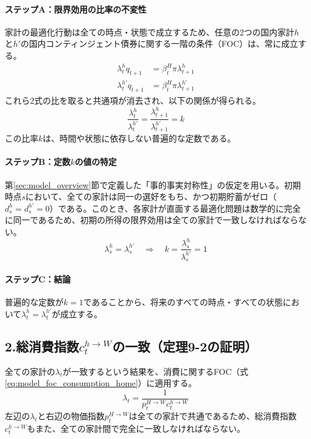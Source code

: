 \paragraph{ステップA：限界効用の比率の不変性}
\label{sec:appendix_risk_sharing_sub1_step_a}
家計の最適化行動は全ての時点・状態で成立するため、任意の2つの国内家計\(h\)と\(h'\)の国内コンティンジェント債券に関する一階の条件（FOC）は、常に成立する。
\begin{align}
\lambda_t^hq_{t+1}&=\beta_t^H\pi\lambda_{t+1}^h \label{eq:appendix_risk_sharing_sub1_foc_h} \\
\lambda_t^{h'}q_{t+1}&=\beta_t^H\pi\lambda_{t+1}^{h'} \label{eq:appendix_risk_sharing_sub1_foc_h_prime}
\end{align}
これら2式の比を取ると共通項が消去され、以下の関係が得られる。
\begin{equation}
\frac{\lambda_t^h}{\lambda_t^{h'}}=\frac{\lambda_{t+1}^h}{\lambda_{t+1}^{h'}}=k
    \label{eq:appendix_risk_sharing_sub1_constant_ratio}
\end{equation}
この比率\(k\)は、時間や状態に依存しない普遍的な定数である。

\paragraph{ステップB：定数\(k\)の値の特定}
\label{sec:appendix_risk_sharing_sub1_step_b}
第\ref{sec:model_overview}節で定義した「事的事実対称性」の仮定を用いる。初期時点\(s\)において、全ての家計は同一の選好をもち、かつ初期貯蓄がゼロ（\(d_s^h=d_s^{h'}=0\)）である。このとき、各家計が直面する最適化問題は数学的に完全に同一であるため、初期の所得の限界効用は全ての家計で一致しなければならない。
\begin{equation}
\lambda_s^h=\lambda_s^{h'}\quad\Longrightarrow\quad k=\frac{\lambda_s^h}{\lambda_s^{h'}}=1
\label{eq:appendix_risk_sharing_sub1_k_identity}
\end{equation}

\paragraph{ステップC：結論}
\label{sec:appendix_risk_sharing_sub1_step_c}
普遍的な定数が\(k=1\)であることから、将来のすべての時点・すべての状態において\(\lambda_t^h=\lambda_t^{h'}\)が成立する。

\subsection*{2.総消費指数\(c_t^{h\to W}\)の一致（定理9-2の証明）}
\label{sec:appendix_risk_sharing_sub2}
全ての家計の\(\lambda_t\)が一致するという結果を、消費に関するFOC（式\ref{eq:model_foc_consumption_home}）に適用する。
\begin{equation}
\lambda_t=\frac{1}{p_t^{H\to W}c_t^{h\to W}}
\label{eq:appendix_risk_sharing_sub2_lambda_def}
\end{equation}
左辺の\(\lambda_t\)と右辺の物価指数\(p_t^{H\to W}\)は全ての家計で共通であるため、総消費指数\(c_t^{h\to W}\)もまた、全ての家計間で完全に一致しなければならない。

